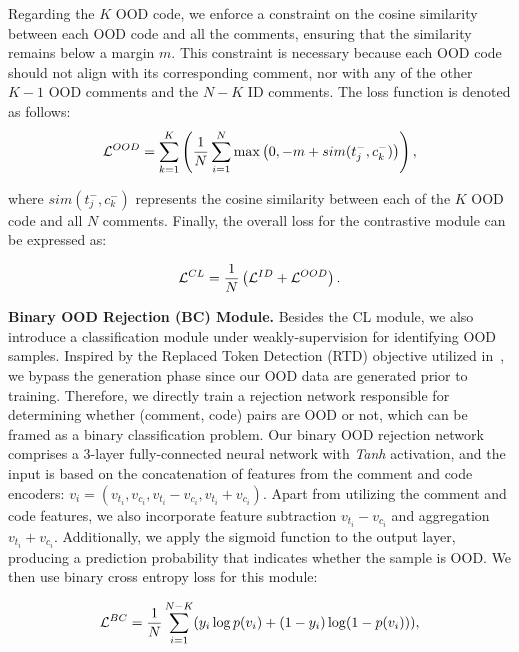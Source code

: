 Regarding the $K$ OOD code, we enforce a constraint on the cosine similarity between each OOD code and all the comments, ensuring that the similarity remains below a margin $m$. This constraint is necessary because each OOD code should not align with its corresponding comment, nor with any of the other $K-1$ OOD comments and the $N-K$ ID comments. The loss function is denoted as follows:
\begin{equation}\small
\label{eq:contrast_ood}
\mathcal{L}^{OOD} = \sum_{k=1}^{K}\left(\frac{1}{N}\sum_{i=1}^N \max \left(0,-m + sim(t_j^-, c_k^-)\right)\right),
\end{equation}

\noindent where $sim(t_j^-, c_k^-)$ represents the cosine similarity between each of the $K$ OOD code and all $N$ comments.
Finally, the overall loss for the contrastive module can be expressed as: 


\begin{equation}\small
\label{eq:contrast}
    \mathcal{L}^{CL} = \frac{1}{N}\left(\mathcal{L}^{ID}+ \mathcal{L}^{OOD}\right).
\end{equation}


\textbf{Binary OOD Rejection (BC) Module.}
Besides the CL module, we also introduce a classification module under weakly-supervision for identifying OOD samples. %
Inspired by the Replaced Token Detection (RTD) objective utilized in~\cite{feng2020codebert}, we bypass the generation phase since our OOD data are generated prior to training. Therefore, we directly train a rejection network responsible for determining whether (comment, code) pairs are OOD or not, which can be framed as a binary classification problem. Our binary OOD rejection network comprises a 3-layer fully-connected neural network with \textit{Tanh} activation, and the input is based on the concatenation of features from the comment and code encoders: 
$v_i = (v_{t_i}, v_{c_i}, v_{t_i} - v_{c_i}, v_{t_i} + v_{c_i}).$ Apart from utilizing the comment and code features, we also incorporate feature subtraction $v_{t_i} - v_{c_i}$ and aggregation $v_{t_i} + v_{c_i}$.  Additionally, we apply the sigmoid function to the output layer, producing a prediction probability that indicates whether the sample is OOD. We then use binary cross entropy loss for this module:

\begin{equation}\small
    \mathcal{L}^{BC} = \frac{1}{N}\sum_{i=1}^{N-K}(y_i\log p(v_i)+(1-y_i)\log(1-p(v_i))),
\end{equation}


